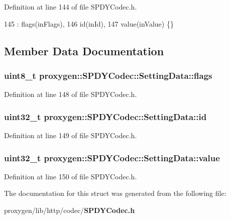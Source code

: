 Definition at line 144 of file S\+P\+D\+Y\+Codec.\+h.


\begin{DoxyCode}
145         : flags(inFlags),
146           id(inId),
147           value(inValue) \{\}
\end{DoxyCode}


\subsection{Member Data Documentation}
\subsubsection[{flags}]{\setlength{\rightskip}{0pt plus 5cm}uint8\+\_\+t proxygen\+::\+S\+P\+D\+Y\+Codec\+::\+Setting\+Data\+::flags}\label{structproxygen_1_1SPDYCodec_1_1SettingData_a636c9d0163867340cbb35ec547316a2e}


Definition at line 148 of file S\+P\+D\+Y\+Codec.\+h.

\subsubsection[{id}]{\setlength{\rightskip}{0pt plus 5cm}uint32\+\_\+t proxygen\+::\+S\+P\+D\+Y\+Codec\+::\+Setting\+Data\+::id}\label{structproxygen_1_1SPDYCodec_1_1SettingData_a4550e068ab6fa856c558f191a0c0a525}


Definition at line 149 of file S\+P\+D\+Y\+Codec.\+h.

\subsubsection[{value}]{\setlength{\rightskip}{0pt plus 5cm}uint32\+\_\+t proxygen\+::\+S\+P\+D\+Y\+Codec\+::\+Setting\+Data\+::value}\label{structproxygen_1_1SPDYCodec_1_1SettingData_aa095e31cb534624b61c43994234e4434}


Definition at line 150 of file S\+P\+D\+Y\+Codec.\+h.



The documentation for this struct was generated from the following file\+:\begin{DoxyCompactItemize}
\item 
proxygen/lib/http/codec/{\bf S\+P\+D\+Y\+Codec.\+h}\end{DoxyCompactItemize}
